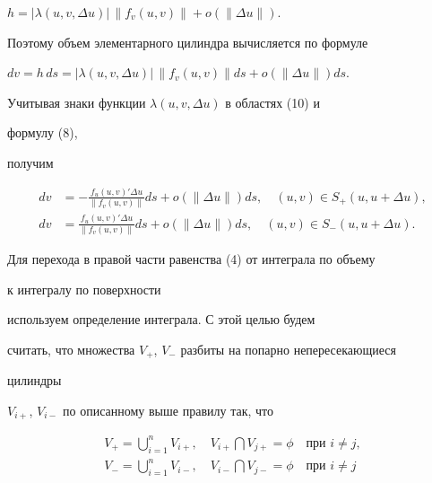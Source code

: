 $h=|\lambda(u,v,\Delta u)|\,\|f_v(u,v)\|+o(\|\Delta u\|)$.


Поэтому объем элементарного цилиндра вычисляется по формуле


$dv=h\,ds=|\lambda(u,v,\Delta u)|\,\|f_v(u,v)\|ds+


o(\|\Delta u\|)ds$.





Учитывая знаки функции $\lambda(u,v,\Delta u)$ в областях (10) и 


формулу (8), 


получим


\begin{equation}


\begin{split}


dv&=-\frac{f_u(u,v)'\Delta u}{\|f_v(u,v)\|}ds+


o(\|\Delta u\|)ds,\quad (u,v)\in S_+(u,u+\Delta u),\\


dv&=\frac{f_u(u,v)'\Delta u}{\|f_v(u,v)\|}ds+


o(\|\Delta u\|)ds,\quad (u,v)\in S_-(u,u+\Delta u).


\end{split}


\end{equation}





Для перехода в правой части равенства (4) от интеграла по объему


к интегралу по поверхности


используем определение интеграла. С этой целью будем 


считать, что множества $V_+$, $V_-$ разбиты на попарно непересекающиеся 


цилиндры


$V_{i+}$, $V_{i-}$ по описанному выше правилу так, что


\begin{gather*}


V_+=\bigcup^n_{i=1}V_{i+},\quad V_{i+}\bigcap V_{j+}=\phi


\quad \text{при $i\ne j$},\\


%


V_-=\bigcup^n_{i=1}V_{i-},\quad V_{i-}\bigcap V_{j-}=\phi


\quad \text{при $i\ne j$}\end{gather*}


